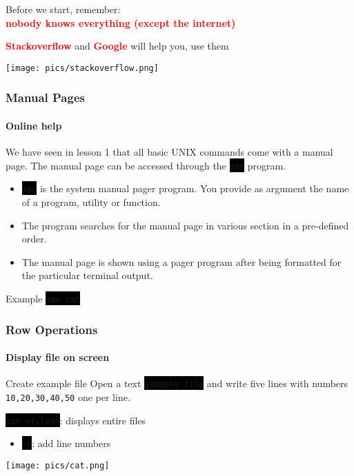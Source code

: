 \documentclass[unknownkeysallowed, 10pt, a4 paper, handout]{beamer}
\newcommand{\focus}[1]{\textbf{\textcolor{red}{#1}}}
\newcommand{\code}[1]{\colorbox{black}{\color{green}\texttt{#1}}}
\newcommand{\sidebyside}[5]{
  \begin{minipage}{#1\textwidth}
    #2
  \end{minipage} #3 \begin{minipage}{#4\textwidth}
    #5
  \end{minipage}
}
\begin{document}
\begin{frame}
  \begin{center}
    Before we start, remember:\\
    \focus{nobody knows everything (except the internet)}

    \focus{Stackoverflow} and \focus{Google} will help you, use them

    \begin{center}
      \texttt{[image: pics/stackoverflow.png]}
    \end{center}
  \end{center}
\end{frame}

\begin{frame}[label=manual]
  \frametitle{Manual Pages}
  \framesubtitle{Online help}
  We have seen in lesson 1 that all basic UNIX commands come with a manual
  page. The manual page can be accessed through the \code{man} program.
  \begin{block}{}
  \begin{itemize}
     \item \code{man} is the system manual pager program. You provide
       as argument the name of a program, utility or function.
     \item The program searches for the manual page in various section in
       a pre-defined order.
     \item The manual page is shown using a pager program after being
       formatted for the particular terminal output.
  \end{itemize}
  \end{block}
  \begin{exampleblock}{Example}
    \code{man cat}
  \end{exampleblock}
\end{frame}

\begin{frame}
  \frametitle{Row Operations}
  \framesubtitle{Display file on screen}

  \begin{exampleblock}{Create example file}
      Open a text \code{example\_file} and write five lines with
      numbers \texttt{10,20,30,40,50} one per line.
  \end{exampleblock}
  \begin{block}{\code{cat <files>}: displays entire files}
    \sidebyside{0.53}{
      \begin{itemize}
        \item \code{-n}: add line numbers
      \end{itemize}
    }{\hfill}{0.44}{
      \begin{center}
        \texttt{[image: pics/cat.png]}
      \end{center}
    }
  \end{block}
\end{frame}
\end{document}
